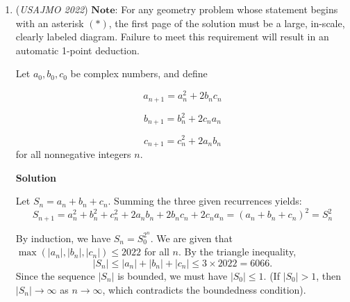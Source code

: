 \begin{enumerate}
 



\textbf{Solution 1}

We first consider the case where one of $p,q$ is even. If $p=2$, $p-q=0$ and $pq-q=2$ which doesn't satisfy the problem restraints. If $q=2$, we can set $p-2=x^2$ and $2p-2=y^2$ giving us $p=y^2-x^2=(y+x)(y-x)$. This forces $y-x=1$ so $p=2x+1\rightarrow 2x+1=x^2+2 \rightarrow x=1$ giving us the solution $(p,q)=(3,2)$.

 
Now assume that $p,q$ are both odd primes. Set $p-q=x^2$ and $pq-q=y^2$ so $(pq-q)-(p-q)=y^2-x^2 \rightarrow p(q-1)$ $=(y+x)(y-x)$. Since $y+x>y-x$, $p | (x+y)$. Note that $q-1$ is an even integer and since $y+x$ and $y-x$ have the same parity, they both must be even. Therefore, $x+y=pk$ for some positive even integer $k$. On the other hand, $p>p-q=x^2 \rightarrow p>x$ and $p^2-p>pq-q=y^2 \rightarrow p>y$. Therefore, $2p>x+y$ so $x+y=p$, giving us a contradiction.

 
Therefore, the only solution to this problem is $(p,q)=(3,2)$.

 


	\item (\textit{USAJMO 2022}) $\textbf{Note:}$ For any geometry problem whose statement begins with an asterisk $(*)$, the first page of the solution must be a large, in-scale, clearly labeled diagram. Failure to meet this requirement will result in an automatic 1-point deduction.


 Let $a_0,b_0,c_0$ be complex numbers, and define


 
 \[a_{n+1}=a_n^2+2b_nc_n\]

 \[b_{n+1}=b_n^2+2c_na_n\]

 \[c_{n+1}=c_n^2+2a_nb_n\]
for all nonnegative integers $n$.


 



\textbf{Solution}

Let $S_n = a_n + b_n + c_n$. Summing the three given recurrences yields:
 \[S_{n+1} = a_n^2 + b_n^2 + c_n^2 + 2a_nb_n + 2b_nc_n + 2c_na_n = (a_n + b_n + c_n)^2 = S_n^2\]

 By induction, we have $S_n = S_0^{2^n}$. We are given that $\max(|a_n|, |b_n|, |c_n|) \le 2022$ for all $n$. By the triangle inequality, 
 \[|S_n| \le |a_n| + |b_n| + |c_n| \le 3 \times 2022 = 6066.\]Since the sequence $|S_n|$ is bounded, we must have $|S_0| \le 1$. (If $|S_0| > 1$, then $|S_n| \to \infty$ as $n \to \infty$, which contradicts the boundedness condition).


\end{enumerate}

